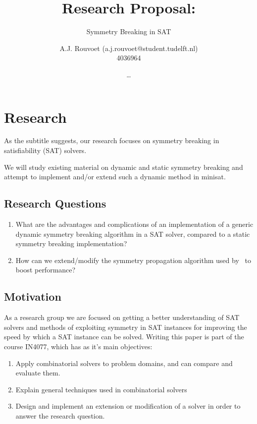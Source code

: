 

	\title{Research Proposal:}
	\author{
		A.J. Rouvoet (a.j.rouvoet@student.tudelft.nl) \\ 4036964 \and
		\ldots
	}

	\subtitle{Symmetry Breaking in SAT}



	\maketitle
	\newpage

	\section{Research}
	As the subtitle suggests, our research focuses on symmetry breaking in satisfiability (SAT) solvers.

	We will study existing material on dynamic and static symmetry breaking and attempt to implement and/or extend such a dynamic method in minisat.

		\subsection{Research Questions}
		\begin{enumerate}
		\item What are the advantages and complications of an implementation of a generic dynamic	symmetry breaking algorithm in a SAT solver, compared to a static symmetry breaking implementation?
		\item How can we extend/modify the symmetry propagation algorithm used by~\cite{devriendt2012symmetry} to boost performance?
		\end{enumerate}

		\subsection{Motivation}
			As a research group we are focused on getting a better understanding of SAT solvers and methods of exploiting symmetry in SAT instances for improving the speed by which a SAT	instance can be solved.	Writing this paper is part of the course IN4077, which has as it's main objectives:

			\begin{enumerate}
				\item
					Apply combinatorial solvers to problem domains, and can compare and evaluate them.
				\item
					Explain general techniques used in combinatorial solvers
				\item
					Design and implement an extension or modification of a solver in order to answer the research question.
			\end{enumerate}

